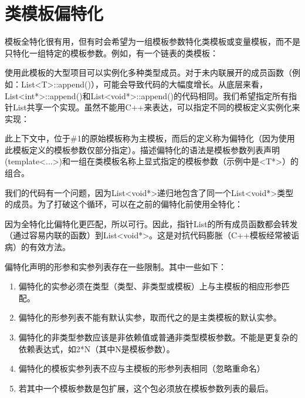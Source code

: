 \section{类模板偏特化}

模板全特化很有用，但有时会希望为一组模板参数特化类模板或变量模板，而不是只特化一组特定的模板参数。例如，有一个链表的类模板：


使用此模板的大型项目可以实例化多种类型成员。对于未内联展开的成员函数（例如：List<T>::append()），可能会导致代码的大幅度增长。从底层来看，List<int*>::append()和List<void*>::append()的代码相同。我们希望指定所有指针List共享一个实现。虽然不能用C++来表达，可以指定不同的模板定义实例化来实现：


此上下文中，位于\#1的原始模板称为主模板，而后的定义称为偏特化（因为使用此模板定义的模板参数仅部分指定）。描述偏特化的语法是模板参数列表声明(template<...>)和一组在类模板名称上显式指定的模板参数（示例中是<T*>）的组合。

我们的代码有一个问题，因为List<void*>递归地包含了同一个List<void*>类型的成员。为了打破这个循环，可以在之前的偏特化前使用全特化：


因为全特化比偏特化更匹配，所以可行。因此，指针List的所有成员函数都会转发（通过容易内联的函数）到List<void*>。这是对抗代码膨胀（C++模板经常被诟病）的有效方法。

偏特化声明的形参和实参列表存在一些限制。其中一些如下：

\begin{enumerate}
\item 
偏特化的实参必须在类型（类型、非类型或模板）上与主模板的相应形参匹配。

\item 
偏特化的形参列表不能有默认实参，取而代之的是主类模板的默认实参。

\item 
偏特化的非类型参数应该是非依赖值或普通非类型模板参数。不能是更复杂的依赖表达式，如2*N（其中N是模板参数）。

\item 
偏特化的模板实参列表不应与主模板的形参列表相同（忽略重命名）

\item 
若其中一个模板参数是包扩展，这个包必须放在模板参数列表的最后。
\end{enumerate}

